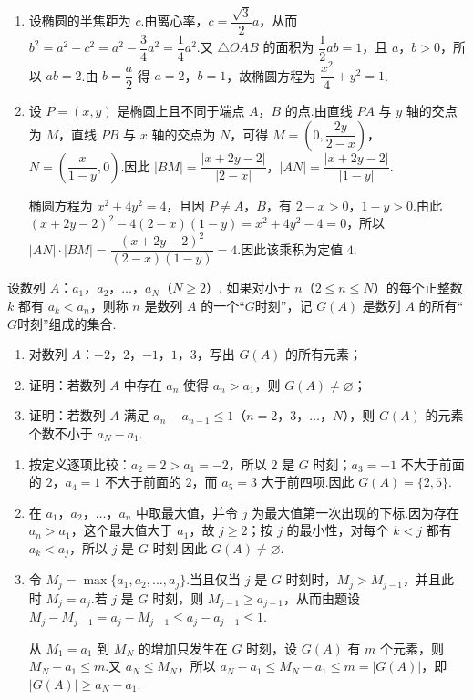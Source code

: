 \begin{solution}
\begin{enumerate}
\item 设椭圆的半焦距为 \(c\).由离心率，\(c=\dfrac{\sqrt3}{2}a\)，从而
\(b^2=a^2-c^2=a^2-\dfrac34a^2=\dfrac14a^2\).又 \(\triangle OAB\) 的面积为 \(\dfrac12ab=1\)，且 \(a\)，\(b>0\)，所以 \(ab=2\).由 \(b=\dfrac a2\) 得 \(a=2\)，\(b=1\)，故椭圆方程为 \(\dfrac{x^2}{4}+y^2=1\).
\item 设 \(P=(x,y)\) 是椭圆上且不同于端点 \(A\)，\(B\) 的点.由直线 \(PA\) 与 \(y\) 轴的交点为 \(M\)，直线 \(PB\) 与 \(x\) 轴的交点为 \(N\)，可得
\(M=\left(0,\dfrac{2y}{2-x}\right)\)，\(N=\left(\dfrac{x}{1-y},0\right)\).因此
\(|BM|=\dfrac{|x+2y-2|}{|2-x|}\)，\(|AN|=\dfrac{|x+2y-2|}{|1-y|}\).

椭圆方程为 \(x^2+4y^2=4\)，且因 \(P\ne A\)，\(B\)，有 \(2-x>0\)，\(1-y>0\).由此
\((x+2y-2)^2-4(2-x)(1-y)=x^2+4y^2-4=0\)，所以
\(|AN|\cdot|BM|=\dfrac{(x+2y-2)^2}{(2-x)(1-y)}=4\).因此该乘积为定值 \(4\).
\end{enumerate}
\end{solution}

\begin{problem}
设数列 \(A\)：\(a_1\)，\(a_2\)，\(\ldots\)，\(a_N\)（\(N\ge2\)）. 如果对小于 \(n\)（\(2\le n\le N\)）的每个正整数 \(k\) 都有 \(a_k<a_n\)，则称 \(n\) 是数列 \(A\) 的一个“\(G\)时刻”，记 \(G(A)\) 是数列 \(A\) 的所有“\(G\)时刻”组成的集合.

\begin{enumerate}
\item 对数列 \(A\)：\(-2\)，\(2\)，\(-1\)，\(1\)，\(3\)，写出 \(G(A)\) 的所有元素；
\item 证明：若数列 \(A\) 中存在 \(a_n\) 使得 \(a_n>a_1\)，则 \(G(A)\ne\varnothing\)；
\item 证明：若数列 \(A\) 满足 \(a_n-a_{n-1}\le1\)（\(n=2\)，\(3\)，\(\ldots\)，\(N\)），则 \(G(A)\) 的元素个数不小于 \(a_N-a_1\).
\end{enumerate}
\end{problem}

\begin{solution}
\begin{enumerate}
\item 按定义逐项比较：\(a_2=2>a_1=-2\)，所以 \(2\) 是 \(G\) 时刻；\(a_3=-1\) 不大于前面的 \(2\)，\(a_4=1\) 不大于前面的 \(2\)，而 \(a_5=3\) 大于前四项.因此 \(G(A)=\{2,5\}\).
\item 在 \(a_1\)，\(a_2\)，\(\ldots\)，\(a_n\) 中取最大值，并令 \(j\) 为最大值第一次出现的下标.因为存在 \(a_n>a_1\)，这个最大值大于 \(a_1\)，故 \(j\ge2\)；按 \(j\) 的最小性，对每个 \(k<j\) 都有 \(a_k<a_j\)，所以 \(j\) 是 \(G\) 时刻.因此 \(G(A)\ne\varnothing\).
\item 令 \(M_j=\max\{a_1,a_2,\ldots,a_j\}\).当且仅当 \(j\) 是 \(G\) 时刻时，\(M_j>M_{j-1}\)，并且此时 \(M_j=a_j\).若 \(j\) 是 \(G\) 时刻，则 \(M_{j-1}\ge a_{j-1}\)，从而由题设
\(M_j-M_{j-1}=a_j-M_{j-1}\le a_j-a_{j-1}\le1\).

从 \(M_1=a_1\) 到 \(M_N\) 的增加只发生在 \(G\) 时刻，设 \(G(A)\) 有 \(m\) 个元素，则 \(M_N-a_1\le m\).又 \(a_N\le M_N\)，所以
\(a_N-a_1\le M_N-a_1\le m=|G(A)|\)，即 \(|G(A)|\ge a_N-a_1\).
\end{enumerate}
\end{solution}
